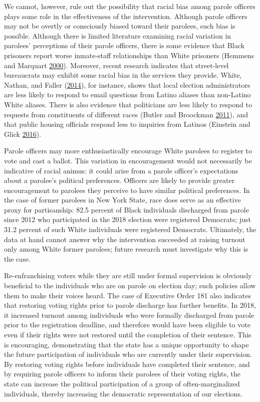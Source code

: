 \documentclass[12pt,]{article}
\begin{document}
We cannot, however, rule out the possibility that racial bias among parole officers plays some role in the effectiveness of the intervention. Although parole officers may not be overtly or consciously biased toward their parolees, such bias is possible. Although there is limited literature examining racial variation in parolees' perceptions of their parole officers, there is some evidence that Black prisoners report worse inmate-staff relationships than White prisoners (Hemmens and Marquart \protect\hyperlink{ref-Hemmens2000}{2000}). Moreover, recent research indicates that street-level bureaucrats may exhibit some racial bias in the services they provide. White, Nathan, and Faller (\protect\hyperlink{ref-WHITE2014}{2014}), for instance, shows that local election administrators are less likely to respond to email questions from Latino aliases than non-Latino White aliases. There is also evidence that politicians are less likely to respond to requests from constituents of different races (Butler and Broockman \protect\hyperlink{ref-Butler2011}{2011}), and that public housing officials respond less to inquiries from Latinos (Einstein and Glick \protect\hyperlink{ref-Einstein2016}{2016}).

Parole officers may more enthusiastically encourage White parolees to register to vote and cast a ballot. This variation in encouragement would not necessarily be indicative of racial animus: it could arise from a parole officer's expectations about a parolee's political preferences. Officers are likely to provide greater encouragement to parolees they perceive to have similar political preferences. In the case of former parolees in New York State, race does serve as an effective proxy for partisanship: 82.5 percent of Black individuals discharged from parole since 2012 who participated in the 2018 election were registered Democrats; just 31.2 percent of such White individuals were registered Democrats. Ultimately, the data at hand cannot answer why the intervention succeeded at raising turnout only among White former parolees; future research must investigate why this is the case.

Re-enfranchising voters while they are still under formal supervision is obviously beneficial to the individuals who are on parole on election day; such policies allow them to make their voices heard. The case of Executive Order 181 also indicates that restoring voting rights prior to parole discharge has further benefits. In 2018, it increased turnout among individuals who were formally discharged from parole prior to the registration deadline, and therefore would have been eligible to vote even if their rights were not restored until the completion of their sentence. This is encouraging, demonstrating that the state has a unique opportunity to shape the future participation of individuals who are currently under their supervision. By restoring voting rights before individuals have completed their sentence, and by requiring parole officers to inform their parolees of their voting rights, the state can increase the political participation of a group of often-marginalized individuals, thereby increasing the democratic representation of our elections.
\end{document}
